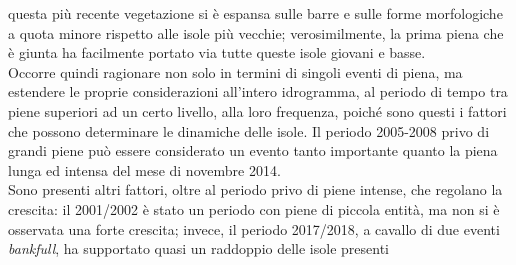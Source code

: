questa più recente vegetazione si è espansa sulle barre e sulle forme morfologiche a quota minore rispetto alle isole più vecchie;
verosimilmente, la prima piena che è giunta ha facilmente portato via tutte queste isole giovani e basse.
\\
Occorre quindi ragionare non solo in termini di singoli eventi di piena, ma estendere le proprie considerazioni all'intero idrogramma, al periodo di tempo tra piene superiori ad un certo livello, alla loro frequenza, poiché sono questi i fattori che possono determinare le dinamiche delle isole.
Il periodo 2005-2008 privo di grandi piene può essere considerato un evento tanto importante quanto la piena lunga ed intensa del mese di novembre 2014.
\\
Sono presenti altri fattori, oltre al periodo privo di piene intense, che regolano la crescita: il 2001/2002 è stato un periodo con piene di piccola entità, ma non si è osservata una forte crescita; invece, il periodo 2017/2018, a cavallo di due eventi \emph{bankfull}, ha supportato quasi un raddoppio delle isole presenti

